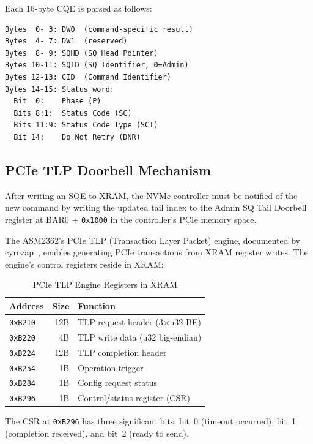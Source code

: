 \documentclass[conference]{IEEEtran}
\begin{document}
Each 16-byte CQE is parsed as follows:

\begin{lstlisting}[style=hex,caption={Admin CQ entry structure (16 bytes,
little-endian).},label={lst:cqe}]
Bytes  0- 3: DW0  (command-specific result)
Bytes  4- 7: DW1  (reserved)
Bytes  8- 9: SQHD (SQ Head Pointer)
Bytes 10-11: SQID (SQ Identifier, 0=Admin)
Bytes 12-13: CID  (Command Identifier)
Bytes 14-15: Status word:
  Bit  0:    Phase (P)
  Bits 8:1:  Status Code (SC)
  Bits 11:9: Status Code Type (SCT)
  Bit 14:    Do Not Retry (DNR)
\end{lstlisting}


\subsection{PCIe TLP Doorbell Mechanism}
\label{sec:doorbell}

After writing an SQE to XRAM, the NVMe controller must be notified of
the new command by writing the updated tail index to the Admin SQ Tail
Doorbell register at BAR0 + \texttt{0x1000} in the controller's PCIe
memory space.

The ASM2362's PCIe TLP (Transaction Layer Packet) engine, documented by
cyrozap~\cite{cyrozap-usb-pcie}, enables generating PCIe transactions
from XRAM register writes. The engine's control registers reside in XRAM:

\begin{table}[ht]
\centering
\caption{PCIe TLP Engine Registers in XRAM}
\label{tab:tlp-regs}
\begin{tabular}{@{}lrl@{}}
\toprule
Address & Size & Function \\
\midrule
\texttt{0xB210} & 12B & TLP request header (3$\times$u32 BE) \\
\texttt{0xB220} & 4B & TLP write data (u32 big-endian) \\
\texttt{0xB224} & 12B & TLP completion header \\
\texttt{0xB254} & 1B & Operation trigger \\
\texttt{0xB284} & 1B & Config request status \\
\texttt{0xB296} & 1B & Control/status register (CSR) \\
\bottomrule
\end{tabular}
\end{table}

The CSR at \texttt{0xB296} has three significant bits: bit~0 (timeout
occurred), bit~1 (completion received), and bit~2 (ready to send).
\end{document}
